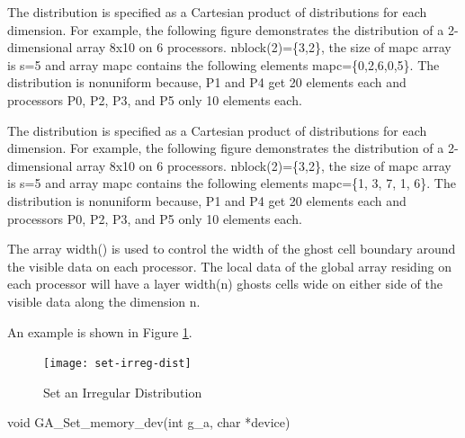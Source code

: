 \documentclass[12pt]{article}
\begin{document}
\begin{cxxdesc}
The distribution is specified as a Cartesian product of distributions for each
dimension. For example, the following figure demonstrates the distribution of a
2-dimensional array 8x10 on 6 processors. nblock(2)=\{3,2\}, the size
of mapc array is s=5 and array mapc contains the following elements
mapc=\{0,2,6,0,5\}. The distribution is nonuniform because, P1 and P4 get 20
elements each and processors P0, P2, P3, and P5 only 10 elements each.
\end{cxxdesc}

\begin{pydesc}
The distribution is specified as a Cartesian product of distributions for each
dimension. For example, the following figure demonstrates the distribution of a
2-dimensional array 8x10 on 6 processors. nblock(2)=\{3,2\}, the size
of mapc array is s=5 and array mapc contains the following elements mapc=\{1,
3, 7, 1, 6\}. The distribution is nonuniform because, P1 and P4 get 20 elements
each and processors P0, P2, P3, and P5 only 10 elements each.
\end{pydesc}

\begin{desc}
The array width() is used to control the width of the ghost cell boundary
around the visible data on each processor. The local data of the global array
residing on each processor will have a layer width(n) ghosts cells wide on
either side of the visible data along the dimension n.

An example is shown in Figure \ref{setirregdist}.

\begin{figure}
\centering
\texttt{[image: set-irreg-dist]}
\caption{Set an Irregular Distribution}
\label{setirregdist}
\end{figure}

\end{desc}



\begin{capi}
\begin{ccode}
void GA_Set_memory_dev(int g_a, char *device)
\end{ccode}
\begin{funcargs}
\end{funcargs}
\end{capi}
\end{document}
